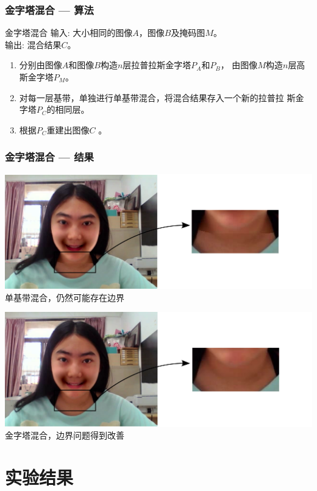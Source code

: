 \documentclass[xcolor=svgnames,serif,table,10pt]{beamer}
\begin{document}
\begin{frame}
  \frametitle{金字塔混合 --- 算法}
  \begin{exampleblock}{金字塔混合}
    \textcolor{black!60!green}{输入}: 大小相同的图像$A$，图像$B$及掩码图$M$。\\
    \textcolor{black!60!green}{输出}: 混合结果$C$。
    \begin{enumerate}[(S1)]
    \item 分别由图像$A$和图像$B$构造$n$层拉普拉斯金字塔$P_A$和$P_B$，
    由图像$M$构造$n$层高斯金字塔$P_M$。
    \item 对每一层基带，单独进行单基带混合，将混合结果存入一个新的拉普拉
    斯金字塔$P_C$的相同层。
    \item 根据$P_C$重建出图像$C$ 。
    \end{enumerate}
  \end{exampleblock}
\end{frame}

\begin{frame}
  \frametitle{金字塔混合 --- 结果}
  \scriptsize
  \begin{center}
    \includegraphics[width=.6\textwidth]{single-band-blend-asy.pdf}\\
    单基带混合，仍然可能存在边界

    \medskip
    \includegraphics[width=.6\textwidth]{pyramid-blend-asy.pdf}\\
    金字塔混合，边界问题得到改善
  \end{center}
\end{frame}

\section{实验结果}
\end{document}
